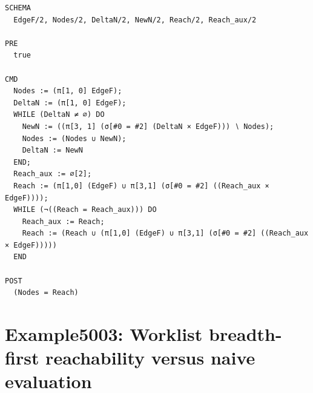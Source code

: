 \documentclass[10pt]{article}
\begin{document}
\begin{Verbatim}[fontsize=\scriptsize,breaklines=true,breakanywhere=true,frame=single,framesep=1.5mm]
SCHEMA
  EdgeF/2, Nodes/2, DeltaN/2, NewN/2, Reach/2, Reach_aux/2

PRE
  true 

CMD
  Nodes := (π[1, 0] EdgeF);
  DeltaN := (π[1, 0] EdgeF);
  WHILE (DeltaN ≠ ∅) DO
    NewN := ((π[3, 1] (σ[#0 = #2] (DeltaN × EdgeF))) ∖ Nodes);
    Nodes := (Nodes ∪ NewN);
    DeltaN := NewN
  END;
  Reach_aux := ∅[2];
  Reach := (π[1,0] (EdgeF) ∪ π[3,1] (σ[#0 = #2] ((Reach_aux × EdgeF))));
  WHILE (¬((Reach = Reach_aux))) DO
    Reach_aux := Reach;
    Reach := (Reach ∪ (π[1,0] (EdgeF) ∪ π[3,1] (σ[#0 = #2] ((Reach_aux × EdgeF)))))
  END

POST
  (Nodes = Reach)
\end{Verbatim}

\Needspace{0.45\textheight}

\section{Example5003: Worklist breadth-first reachability versus naive evaluation}\label{case:Example5003}
\end{document}
